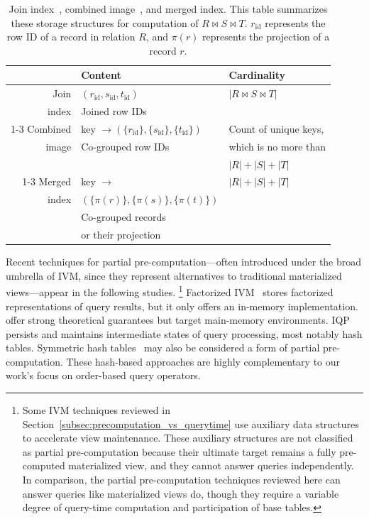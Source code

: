 \documentclass[sigconf, pdfa, nonacm]{acmart}
\begin{document}
\begin{table}[htbp]
    \small
    \centering
        \caption{Join index~\cite{oneil1995joinindex,valduriez87joinindex}, combined image~\cite{haerder1978combined}, and merged index. \textnormal{This table summarizes these storage structures for computation of \(R \bowtie S \bowtie T\). \(r_\text{id}\) represents the row ID of a record in relation \(R\), and \(\pi(r)\) represents the projection of a record \(r\).}}\label{tab:partial-precomp}
    \begin{tabular}{r l l}
        \toprule
        & Content & Cardinality \\
        \midrule
        Join& \( (r_\text{id}, s_\text{id}, t_\text{id}) \) & \( |R \bowtie S \bowtie T| \)\\
        index & Joined row IDs & \\
        \cmidrule{1-3}
        Combined&key \(\rightarrow (\{r_\text{id}\}, \{s_\text{id}\}, \{t_\text{id}\})\)&Count of unique keys,\\
        image & Co-grouped row IDs  & which is no more than\\
        && \( |R| + |S| + |T| \)\\
        \cmidrule{1-3}
        Merged&key \(\rightarrow\)& \( |R| + |S| + |T| \)\\
        index &\((\{\pi(r)\}, \{\pi(s)\}, \{\pi(t)\})\)&\\
        & Co-grouped records & \\
        & or their projection & \\
        \bottomrule
    \end{tabular}
\end{table}

Recent techniques for partial pre-computation---often introduced under the broad umbrella of IVM, since they represent alternatives to traditional materialized views---appear in the following studies.
\footnote{
Some IVM techniques reviewed in Section~\ref{subsec:precomputation_vs_querytime} use auxiliary data structures to accelerate view maintenance.
These auxiliary structures are not classified as partial pre-computation because their ultimate target remains a fully pre-computed materialized view, and they cannot answer queries independently.
In comparison, the partial pre-computation techniques reviewed here can answer queries like materialized views do, though they require a variable degree of query-time computation and participation of base tables.
}
Factorized IVM~\cite{f-ivm, factorizedDB} stores factorized representations of query results, but it only offers an in-memory implementation.
 offer strong theoretical guarantees but target main-memory environments. 
IQP~\cite{iqp} persists and maintains intermediate states of query processing, most notably hash tables. 
Symmetric hash tables~\cite{wilschut1991shj, hong1993shj, Urhan2000XJoinAR, lawrence2005early} may also be considered a form of partial pre-computation.
These hash-based approaches are highly complementary to our work's focus on order-based query operators.
\end{document}
